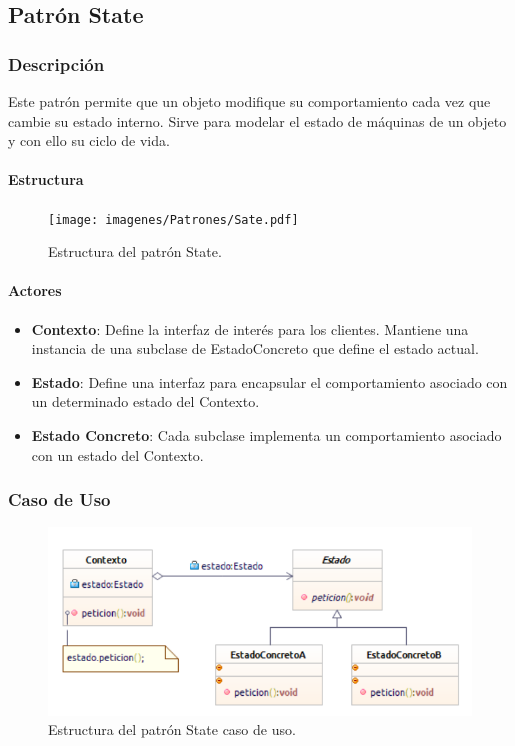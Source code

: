 \subsection{Patrón State}

\subsubsection{Descripción}
Este patrón permite que un objeto modifique su comportamiento cada vez que cambie su estado interno. Sirve para modelar el estado de máquinas de un objeto y con ello su ciclo de vida.

\paragraph{Estructura}

\begin{figure}[th!]
	\centering
	\texttt{[image: imagenes/Patrones/Sate.pdf]}
	\caption{Estructura del patrón State.\cite{gof}}	
\end{figure}

\paragraph{Actores}

\begin{itemize}
	\item \textbf{Contexto}: Define la interfaz de interés para los clientes. Mantiene una instancia de una subclase de EstadoConcreto que define el estado actual.
	\item \textbf{Estado}: Define una interfaz para encapsular el comportamiento asociado con un determinado estado del Contexto.
	\item \textbf{Estado Concreto}: Cada subclase implementa un comportamiento asociado con un estado del Contexto.
\end{itemize}


\subsubsection{Caso de Uso}
\begin{figure}[th!]
	\centering
	\includegraphics[width=.7\linewidth]{imagenes/Patrones/State_caso.pdf}
	\caption{Estructura del patrón State caso de uso.\cite{gof}}	
\end{figure}
